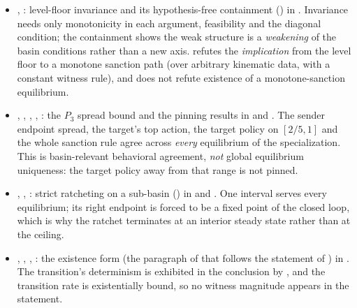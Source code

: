 \begin{itemize}[leftmargin=1.4em,itemsep=1pt]
state where the sanction exceeds the ceiling.
\item {},
: level-floor
invariance and its hypothesis-free containment
() in .
Invariance needs only monotonicity in each argument, feasibility and the
diagonal condition; the containment shows the weak structure is a
\emph{weakening} of the basin conditions rather than a new axis.
 refutes the \emph{implication} from the
level floor to a monotone sanction path (over arbitrary kinematic data, with
a constant witness rule), and does not refute existence of a monotone-sanction
equilibrium.
\item {}, ,
, ,
: the $P_3$ spread bound and the pinning results in
 and
.  The sender endpoint spread, the target's top
action, the target policy on $[2/5,1]$ and the whole sanction rule agree
across \emph{every} equilibrium of the specialization.  This is
basin-relevant behavioral agreement, \emph{not} global equilibrium
uniqueness: the target policy away from that range is not pinned.
\item {},
,
: strict ratcheting
on a sub-basin () in
 and
.  One interval serves
every equilibrium; its right endpoint is forced to be a fixed point of the
closed loop, which is why the ratchet terminates at an interior steady state
rather than at the ceiling.
\item {},
,
,
: the existence form
(the paragraph of  that follows the
statement of ) in
.  The transition's
determinism is exhibited in the conclusion by , and the transition
rate is existentially bound, so no witness magnitude appears in the statement.

\end{itemize}
